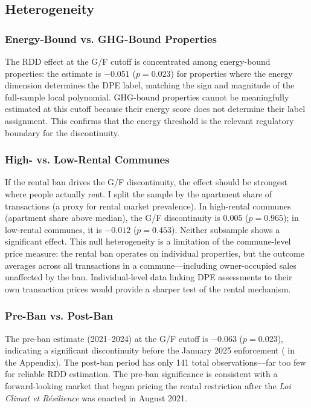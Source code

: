 \documentclass[12pt]{article}
\begin{document}
\subsection{Heterogeneity}

\subsubsection{Energy-Bound vs. GHG-Bound Properties}

The RDD effect at the G/F cutoff is concentrated among energy-bound properties: the estimate is $-0.051$ ($p = 0.023$) for properties where the energy dimension determines the DPE label, matching the sign and magnitude of the full-sample local polynomial. GHG-bound properties cannot be meaningfully estimated at this cutoff because their energy score does not determine their label assignment. This confirms that the energy threshold is the relevant regulatory boundary for the discontinuity.

\subsubsection{High- vs. Low-Rental Communes}

If the rental ban drives the G/F discontinuity, the effect should be strongest where people actually rent. I split the sample by the apartment share of transactions (a proxy for rental market prevalence). In high-rental communes (apartment share above median), the G/F discontinuity is $0.005$ ($p = 0.965$); in low-rental communes, it is $-0.012$ ($p = 0.453$). Neither subsample shows a significant effect. This null heterogeneity is a limitation of the commune-level price measure: the rental ban operates on individual properties, but the outcome averages across all transactions in a commune---including owner-occupied sales unaffected by the ban. Individual-level data linking DPE assessments to their own transaction prices would provide a sharper test of the rental mechanism.

\subsubsection{Pre-Ban vs. Post-Ban}

The pre-ban estimate (2021--2024) at the G/F cutoff is $-0.063$ ($p = 0.023$), indicating a significant discontinuity before the January 2025 enforcement ( in the Appendix). The post-ban period has only 141 total observations---far too few for reliable RDD estimation. The pre-ban significance is consistent with a forward-looking market that began pricing the rental restriction after the \textit{Loi Climat et R\'esilience} was enacted in August 2021.
\end{document}
